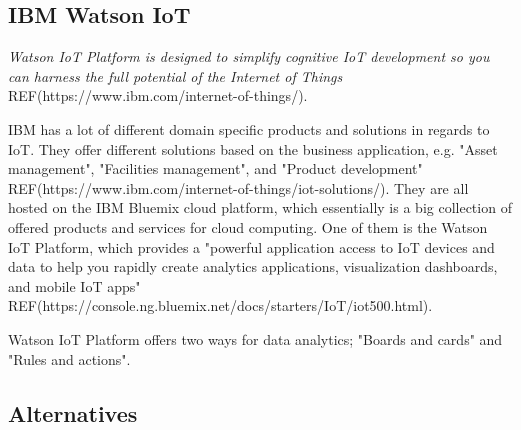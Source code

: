 \subsection{IBM Watson IoT}
\textit{Watson IoT Platform is designed to simplify cognitive IoT development so you can harness the full potential of the Internet of Things} REF(https://www.ibm.com/internet-of-things/).

IBM has a lot of different domain specific products and solutions in regards to IoT. They offer different solutions based on the business application, e.g. "Asset management", "Facilities management", and "Product development" REF(https://www.ibm.com/internet-of-things/iot-solutions/). They are all hosted on the IBM Bluemix cloud platform, which essentially is a big collection of offered products and services for cloud computing. One of them is the Watson IoT Platform, which provides a "powerful application access to IoT devices and data to help you rapidly create analytics applications, visualization dashboards, and mobile IoT apps" REF(https://console.ng.bluemix.net/docs/starters/IoT/iot500.html).  

Watson IoT Platform offers two ways for data analytics; "Boards and cards" and "Rules and actions".


\subsection{Alternatives}
